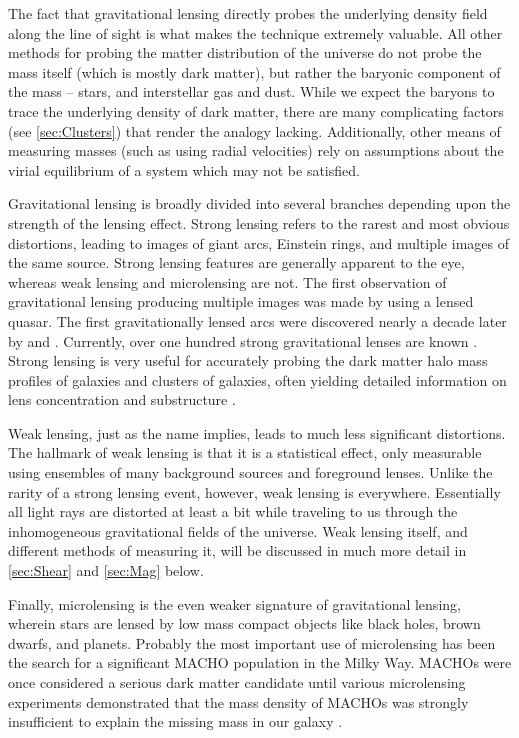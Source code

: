 The fact that gravitational lensing directly probes the underlying density field along the line of sight is what makes the technique extremely valuable. All other methods for probing the matter distribution of the universe do not probe the mass itself (which is mostly dark matter), but rather the baryonic component of the mass -- stars, and interstellar gas and dust. While we expect the baryons to trace the underlying density of dark matter, there are many complicating factors (see \autoref{sec:Clusters}) that render the analogy lacking. Additionally, other means of measuring masses (such as using radial velocities) rely on assumptions about the virial equilibrium of a system which may not be satisfied.

Gravitational lensing is broadly divided into several branches depending upon the strength of the lensing effect. Strong lensing refers to the rarest and most obvious distortions, leading to images of giant arcs, Einstein rings, and multiple images of the same source. Strong lensing features are generally apparent to the eye, whereas weak lensing and microlensing are not. The first observation of gravitational lensing producing multiple images was made by \citet{Walsh79} using a lensed quasar. The first gravitationally lensed arcs were discovered nearly a decade later by \citet{Lynds86} and \citet{Soucail87,Soucail88}. Currently, over one hundred strong gravitational lenses are known \citep{Browne03,Bolton08}. Strong lensing is very useful for accurately probing the dark matter halo mass profiles of galaxies and clusters of galaxies, often yielding detailed information on lens concentration \citep{Auger10} and substructure \citep{Mao98,Dalal02}. 

Weak lensing, just as the name implies, leads to much less significant distortions. The hallmark of weak lensing is that it is a statistical effect, only measurable using ensembles of many background sources and foreground lenses. Unlike the rarity of a strong lensing event, however, weak lensing is everywhere. Essentially all light rays are distorted at least a bit while traveling to us through the inhomogeneous gravitational fields of the universe. Weak lensing itself, and different methods of measuring it, will be discussed in much more detail in \autoref{sec:Shear} and \autoref{sec:Mag} below. 

Finally, microlensing is the even weaker signature of gravitational lensing, wherein stars are lensed by low mass compact objects like black holes, brown dwarfs, and planets. Probably the most important use of microlensing has been the search for a significant \acf{MACHO} population in the Milky Way. \ac{MACHO}s were once considered a serious dark matter candidate until various microlensing experiments demonstrated that the mass density of \ac{MACHO}s was strongly insufficient to explain the missing mass in our galaxy \citep{Paczynski96,Wyrzykowski11,Sumi13}.


